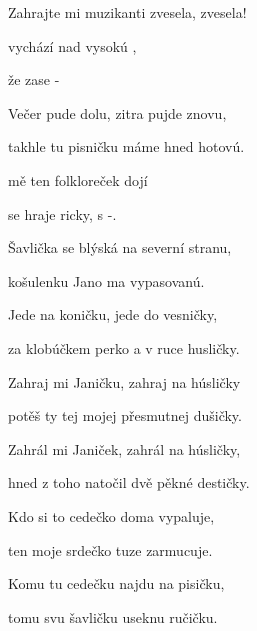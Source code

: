 

Zahrajte mi muzikanti zvesela, zvesela!

\zs
{} vychází nad vysokú ,

 že   zase -

Večer pude dolu, zitra pujde znovu,

takhle tu pisničku máme hned hotovú.
\ks

\zr
{} mě ten folkloreček {do}{jí}

 se hraje ricky,  s -.
\kr

\zs
Šavlička se blýská na severní stranu,

košulenku Jano ma vypasovanú.

Jede na koničku, jede do vesničky,

za klobúčkem perko a v ruce husličky.
\ks

\zr  \kr

\zs
Zahraj mi Janičku, zahraj na húsličky

potěš ty tej mojej přesmutnej dušičky.

Zahrál mi Janiček, zahrál na húsličky,

hned z toho natočil dvě pěkné destičky.

\ks

\zr  \kr

\zs
Kdo si to cedečko doma vypaluje,

ten moje srdečko tuze zarmucuje.

Komu tu cedečku najdu na pisičku,

tomu svu šavličku useknu ručičku.
\ks

\zr  \kr

\kp






